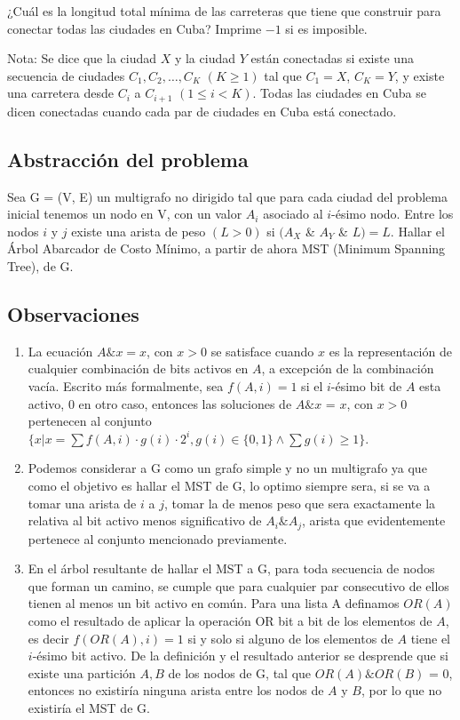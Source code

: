 \documentclass{article}
\begin{document}
¿Cuál es la longitud total mínima de las carreteras que tiene que construir para conectar todas las ciudades en Cuba? Imprime $-1$ si es imposible.

Nota: Se dice que la ciudad $X$ y la ciudad $Y$ están conectadas si existe una secuencia de ciudades $C_1, C_2, \dots, C_K$ $(K \geq 1)$ tal que $C_1 = X$, $C_K = Y$, y existe una carretera desde $C_i$ a $C_{i+1}$ $(1 \leq i < K)$. Todas las ciudades en Cuba se dicen conectadas cuando cada par de ciudades en Cuba está conectado.

\subsection{Abstracción del problema}

Sea G = (V, E) un multigrafo no dirigido tal que para cada ciudad del problema inicial tenemos un nodo en V, con un valor $A_i$ asociado al $i$-ésimo nodo. Entre los nodos $i$ y $j$ existe una arista de peso $(L > 0)$ si $(A_X$ \& $A_Y$ \& $L) = L$. Hallar el Árbol Abarcador de Costo Mínimo, a partir de ahora MST (Minimum Spanning Tree), de G.

\subsection{Observaciones}

\begin{enumerate}
    \item La ecuación $A \& x = x$, con $x > 0$ se satisface cuando $x$ es la representación de cualquier combinación de bits activos en $A$, a excepción de la combinación vacía. Escrito más formalmente, sea $f(A, i) = 1$ si el $i$-ésimo bit de $A$ esta activo, 0 en otro caso, entonces las soluciones de $A \& x$ = $x$, con $x > 0$ pertenecen al conjunto $\{x | x = \sum f(A, i) \cdot g(i) \cdot 2 ^i, g(i) \in \{0, 1\} \land \sum g(i) \geq 1\}$.
    \item Podemos considerar a G como un grafo simple y no un multigrafo ya que como el objetivo es hallar el MST de G, lo optimo siempre sera, si se va a tomar una arista de $i$ a $j$, tomar la de menos peso que sera exactamente la relativa al bit activo menos significativo de $A_i \&  A_j$, arista que evidentemente pertenece al conjunto mencionado previamente.
    \item En el árbol resultante de hallar el MST a G, para toda secuencia de nodos que forman un camino, se cumple que para cualquier par consecutivo de ellos tienen al menos un bit activo en común. Para una lista A definamos $OR(A)$ como el resultado de aplicar la operación OR bit a bit de los elementos de $A$, es decir $f(OR(A), i) = 1$ si y solo si alguno de los elementos de $A$ tiene el $i$-ésimo bit activo. De la definición y el resultado anterior se desprende que si existe una partición $A, B$ de los nodos de G, tal que $OR(A) \& OR(B)$ = 0, entonces no existiría ninguna arista entre los nodos de $A$ y $B$, por lo que no existiría el MST de G.
    
\end{enumerate}
\end{document}
